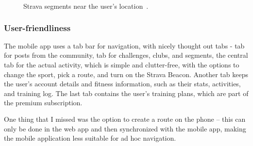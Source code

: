 \begin{figure}[htb!]
    \centering
        \caption{Strava segments near the user's location~\cite{strava-segments-img}.}
        \label{strava-segments-img}
\end{figure}

\subsubsection*{User-friendliness}
The mobile app uses a tab bar for navigation, with nicely thought out tabs -  tab for posts from the community,  tab for challenges, clubs, and segments,
the central  tab for the actual activity, which is simple and clutter-free, with the options to change the sport, pick a route, and turn on the Strava Beacon.
Another tab  keeps the user's account details and fitness information, such as their stats, activities, and training log.
The last tab  contains the user's training plans, which are part of the premium subscription.

One thing that I missed was the option to create a route on the phone -- this can only be done in the web app and then synchronized with the mobile app, making the mobile application less suitable for ad hoc navigation.

